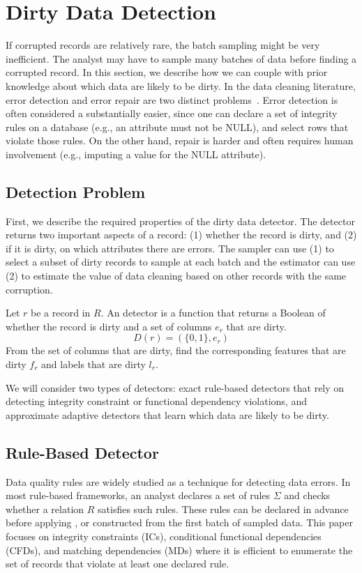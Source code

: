 \section{Dirty Data Detection}\label{det}
If corrupted records are relatively rare, the batch sampling might be very inefficient.
The analyst may have to sample many batches of data before finding a corrupted record.
In this section, we describe how we can couple \sys with prior knowledge about which data are likely to be dirty.
In the data cleaning literature, error detection and error repair are two distinct problems~\cite{DBLP:series/synthesis/2012Fan, Dasu:2003:EDM:861869, rahm2000data}.
Error detection is often considered a substantially easier, since one can declare a set of integrity rules on a database (e.g., an attribute must not be NULL), and select rows that violate those rules.
On the other hand, repair is harder and often requires human involvement (e.g., imputing a value for the NULL attribute).

\subsection{Detection Problem}
First, we describe the required properties of the dirty data detector.
The detector returns two important aspects of a record: 
(1) whether the record is dirty, and (2) if it is dirty, on which attributes there are errors.
The sampler can use (1) to select a subset of dirty records to sample at each batch and 
the estimator can use (2) to estimate the value of data cleaning based on other records with the same corruption.

\begin{definition}[Detector]
Let $r$ be a record in $R$. An detector is a function that returns a Boolean of whether the record is dirty and a set of columns $e_r$ that are dirty.
\[
D(r) = (\{0,1\}, e_r)
\]
From the set of columns that are dirty, find the corresponding features that are dirty $f_r$ and labels that are dirty $l_r$.
\end{definition}

We will consider two types of detectors: exact rule-based detectors that rely on detecting integrity constraint or functional dependency violations, and approximate adaptive detectors that learn which data are likely to be dirty.

\subsection{Rule-Based Detector}\label{rule-det}
Data quality rules are widely studied as a technique for detecting data errors.
In most rule-based frameworks, an analyst declares a set of rules $\Sigma$ and checks whether a relation $R$ satisfies such rules.
These rules can be declared in advance before applying \sys, or constructed from the first batch of sampled data.
This paper focuses on integrity constraints (ICs), conditional functional dependencies (CFDs), and matching dependencies (MDs) where it is efficient to enumerate the set of records that violate at least one declared rule. 

